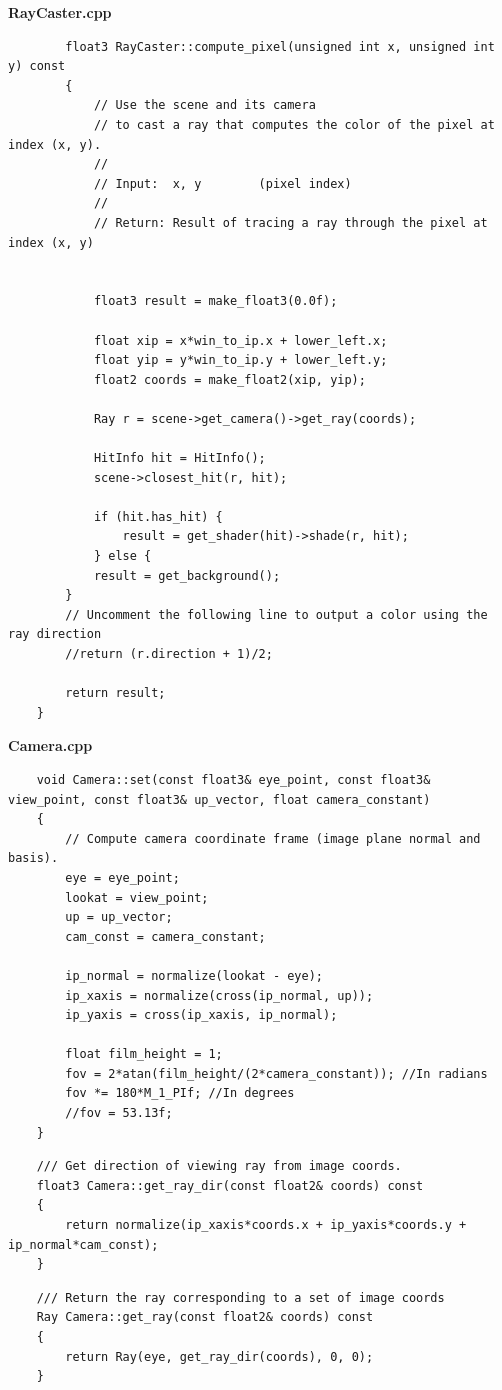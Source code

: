 \documentclass[a4,12pt]{article}
\begin{document}
	\textbf{RayCaster.cpp}
	\begin{lstlisting}
		float3 RayCaster::compute_pixel(unsigned int x, unsigned int y) const
		{
			// Use the scene and its camera
			// to cast a ray that computes the color of the pixel at index (x, y).
			//
			// Input:  x, y        (pixel index)
			//
			// Return: Result of tracing a ray through the pixel at index (x, y)
			
			
			float3 result = make_float3(0.0f);
						
			float xip = x*win_to_ip.x + lower_left.x;
			float yip = y*win_to_ip.y + lower_left.y;
			float2 coords = make_float2(xip, yip);
			
			Ray r = scene->get_camera()->get_ray(coords);
			
			HitInfo hit = HitInfo();
			scene->closest_hit(r, hit);
			
			if (hit.has_hit) {
				result = get_shader(hit)->shade(r, hit);
			} else {
			result = get_background();
		}
		// Uncomment the following line to output a color using the ray direction 
		//return (r.direction + 1)/2;
		
		return result;
	}
	\end{lstlisting}
	
	\textbf{Camera.cpp}
	\begin{lstlisting}
	void Camera::set(const float3& eye_point, const float3& view_point, const float3& up_vector, float camera_constant)
	{
		// Compute camera coordinate frame (image plane normal and basis).
		eye = eye_point;
		lookat = view_point;
		up = up_vector;
		cam_const = camera_constant;
		
		ip_normal = normalize(lookat - eye);
		ip_xaxis = normalize(cross(ip_normal, up));
		ip_yaxis = cross(ip_xaxis, ip_normal);
		
		float film_height = 1;
		fov = 2*atan(film_height/(2*camera_constant)); //In radians
		fov *= 180*M_1_PIf; //In degrees
		//fov = 53.13f;
	}
	\end{lstlisting}
	
	\begin{lstlisting}
	/// Get direction of viewing ray from image coords.
	float3 Camera::get_ray_dir(const float2& coords) const
	{
		return normalize(ip_xaxis*coords.x + ip_yaxis*coords.y + ip_normal*cam_const);
	}
	\end{lstlisting}
	
	\begin{lstlisting}
	/// Return the ray corresponding to a set of image coords
	Ray Camera::get_ray(const float2& coords) const
	{
		return Ray(eye, get_ray_dir(coords), 0, 0);
	}
	\end{lstlisting}
	
\end{document}
